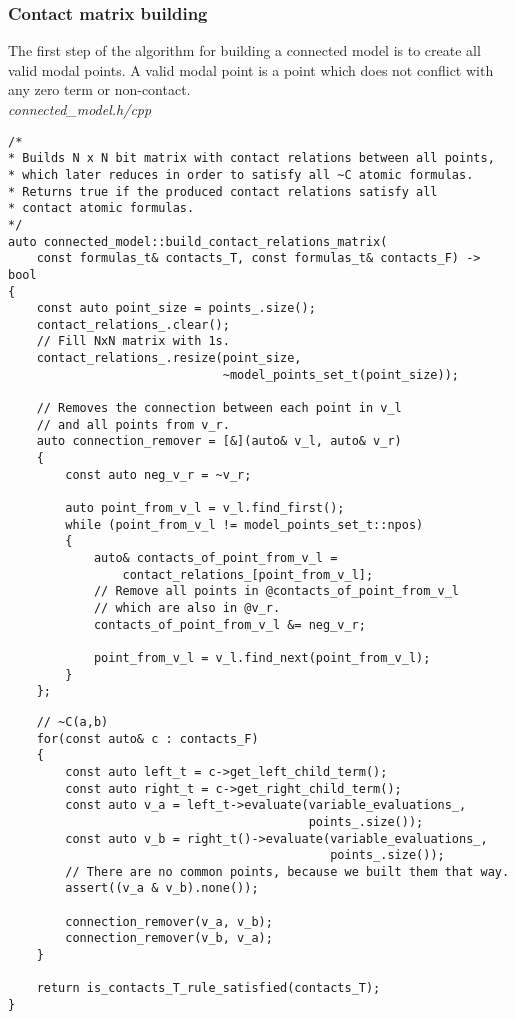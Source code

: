 \documentclass{article}
\begin{document}
	\subsubsection*{Contact matrix building}
	The first step of the algorithm for building a connected model is to create all valid modal points. A valid modal point is a point which does not conflict with any zero term or non-contact.
\\
\noindent
\textit{connected\_model.h/cpp}
\begin{lstlisting}
/*
* Builds N x N bit matrix with contact relations between all points,
* which later reduces in order to satisfy all ~C atomic formulas.
* Returns true if the produced contact relations satisfy all
* contact atomic formulas.
*/
auto connected_model::build_contact_relations_matrix(
    const formulas_t& contacts_T, const formulas_t& contacts_F) -> bool
{
    const auto point_size = points_.size();
    contact_relations_.clear();
    // Fill NxN matrix with 1s.
    contact_relations_.resize(point_size,
                              ~model_points_set_t(point_size));

    // Removes the connection between each point in v_l
    // and all points from v_r.
    auto connection_remover = [&](auto& v_l, auto& v_r)
    {
        const auto neg_v_r = ~v_r;

        auto point_from_v_l = v_l.find_first();
        while (point_from_v_l != model_points_set_t::npos)
        {
            auto& contacts_of_point_from_v_l =
                contact_relations_[point_from_v_l];
            // Remove all points in @contacts_of_point_from_v_l
            // which are also in @v_r.
            contacts_of_point_from_v_l &= neg_v_r;

            point_from_v_l = v_l.find_next(point_from_v_l);
        }
    };
\end{lstlisting}
\newpage
\begin{lstlisting}
    // ~C(a,b)
    for(const auto& c : contacts_F)
    {
        const auto left_t = c->get_left_child_term();
        const auto right_t = c->get_right_child_term();
        const auto v_a = left_t->evaluate(variable_evaluations_,
                                          points_.size());
        const auto v_b = right_t()->evaluate(variable_evaluations_,
                                             points_.size());
		// There are no common points, because we built them that way.
        assert((v_a & v_b).none());

        connection_remover(v_a, v_b);
        connection_remover(v_b, v_a);
    }

    return is_contacts_T_rule_satisfied(contacts_T);
}
\end{lstlisting}
\end{document}

